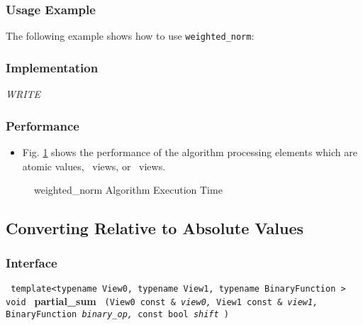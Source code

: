 \subsubsection{Usage Example} %

The following example shows how to use \texttt{weighted\_norm}:

 
\subsubsection{Implementation} %

\textit{WRITE}

\subsubsection{Performance} %

\begin{itemize}
\item
Fig. \ref{fig:wt-norm-alg-exec-exper}
shows the performance of the algorithm processing
elements which are atomic values, \stl\ views, or \stapl\ views.
\end{itemize}

\begin{figure}[p]
\caption{weighted\_norm Algorithm Execution Time}
\label{fig:wt-norm-alg-exec-exper}
\end{figure}

 
\subsection{Converting Relative to Absolute Values} \label{sec-num-part_sum}

\subsubsection{Interface} %

\noindent
\texttt{%
template<typename View0, typename View1, typename BinaryFunction >
\newline
void 
}
\newline
\textbf{partial\_sum}%
\texttt{%
(View0 const \&
\textit{view0,}%
View1 const \&
\textit{view1,}%
BinaryFunction 
\textit{binary\_op,}%
const bool 
\textit{shift}%
)
}
\vspace{0.4cm}

